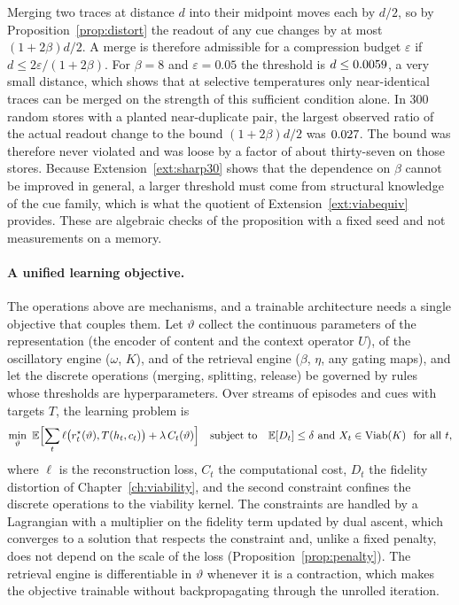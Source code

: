 \begin{workedex}\label{ex:merge42}
Merging two traces at distance $d$ into their midpoint moves each by $d/2$, so by Proposition~\ref{prop:distort} the readout of any cue changes by at most $(1+2\beta)d/2$. A merge is therefore admissible for a compression budget $\varepsilon$ if $d\le2\varepsilon/(1+2\beta)$. For $\beta=8$ and $\varepsilon=0.05$ the threshold is $d\le0.0059$, a very small distance, which shows that at selective temperatures only near-identical traces can be merged on the strength of this sufficient condition alone. In 300 random stores with a planted near-duplicate pair, the largest observed ratio of the actual readout change to the bound $(1+2\beta)d/2$ was $0.027$. The bound was therefore never violated and was loose by a factor of about thirty-seven on those stores. Because Extension~\ref{ext:sharp30} shows that the dependence on $\beta$ cannot be improved in general, a larger threshold must come from structural knowledge of the cue family, which is what the quotient of Extension~\ref{ext:viabequiv} provides. These are algebraic checks of the proposition with a fixed seed and not measurements on a memory.
\end{workedex}


\paragraph{A unified learning objective.} The operations above are mechanisms, and a trainable architecture needs a single objective that couples them. Let $\vartheta$ collect the continuous parameters of the representation (the encoder of content and the context operator $U$), of the oscillatory engine ($\omega$, $K$), and of the retrieval engine ($\beta$, $\eta$, any gating maps), and let the discrete operations (merging, splitting, release) be governed by rules whose thresholds are hyperparameters. Over streams of episodes and cues with targets $T$, the learning problem is
\begin{equation}\label{eq:learnobj}
\min_{\vartheta}\ \Ex\Bigl[\sum_t\ell\bigl(r^\star_t(\vartheta),T(h_t,c_t)\bigr)+\lambda\,C_t(\vartheta)\Bigr]\quad\text{subject to}\quad\Ex[D_t]\le\delta\ \text{and}\ X_t\in\Viab(K)\ \ \text{for all }t,
\end{equation}
where $\ell$ is the reconstruction loss, $C_t$ the computational cost, $D_t$ the fidelity distortion of Chapter~\ref{ch:viability}, and the second constraint confines the discrete operations to the viability kernel. The constraints are handled by a Lagrangian with a multiplier on the fidelity term updated by dual ascent, which converges to a solution that respects the constraint and, unlike a fixed penalty, does not depend on the scale of the loss (Proposition~\ref{prop:penalty}). The retrieval engine is differentiable in $\vartheta$ whenever it is a contraction, which makes the objective trainable without backpropagating through the unrolled iteration.

